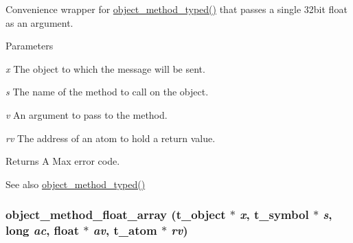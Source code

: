Convenience wrapper for \hyperlink{group__obj_ga443dee482af22e0fe83e68955d367226}{object\_\-method\_\-typed()} that passes a single 32bit float as an argument. 
\begin{DoxyParams}{Parameters}
\item[{\em x}]The object to which the message will be sent. \item[{\em s}]The name of the method to call on the object. \item[{\em v}]An argument to pass to the method. \item[{\em rv}]The address of an atom to hold a return value.\end{DoxyParams}
\begin{DoxyReturn}{Returns}
A Max error code. 
\end{DoxyReturn}
\begin{DoxySeeAlso}{See also}
\hyperlink{group__obj_ga443dee482af22e0fe83e68955d367226}{object\_\-method\_\-typed()} 
\end{DoxySeeAlso}
\hypertarget{group__obj_ga308d41d63efacb1187ace7d3b50b99e1}{
\subsubsection[{object\_\-method\_\-float\_\-array}]{ object\_\-method\_\-float\_\-array ({\bf t\_\-object} $\ast$ {\em x}, \/  {\bf t\_\-symbol} $\ast$ {\em s}, \/  long {\em ac}, \/  float $\ast$ {\em av}, \/  {\bf t\_\-atom} $\ast$ {\em rv})}}
\label{group__obj_ga308d41d63efacb1187ace7d3b50b99e1}


